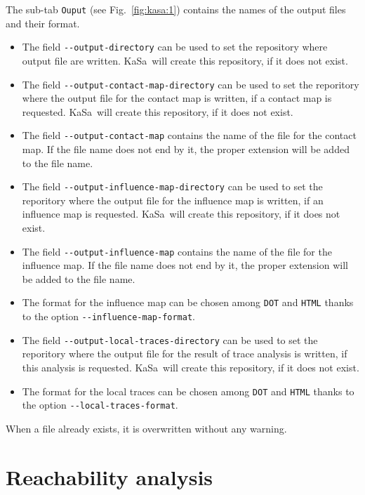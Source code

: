 \documentclass[11pt]{book}
\def\KaSa{\textsf{KaSa}}
\begin{document}
The sub-tab \texttt{Ouput} (see Fig.~\ref{fig:kasa:1}) contains the names of the output files and their format.

\begin{itemize}
\item The field \texttt{-{}-output-directory} can be used to set the repository where output file are written. \KaSa~will create this repository, if it does not exist.
\item The field \texttt{-{}-output-contact-map-directory} can be used to set the reporitory where the output file for the contact map is written, if a contact map is requested. \KaSa~will create this repository, if it does not exist.
\item The field \texttt{-{}-output-contact-map} contains the name of the file for the contact map. If the file name does not end by it, the proper extension will be added to the file name.
\item The field \texttt{-{}-output-influence-map-directory} can be used to set the reporitory where the output file for the influence map is written, if an influence map is requested. \KaSa~will create this repository, if it does not exist.
\item The field \texttt{-{}-output-influence-map} contains the name of the file for the influence map. If the file name does not end by it, the proper extension will be added to the file name.
\item The format for the influence map can be chosen among \texttt{DOT} and \texttt{HTML} thanks to the option \texttt{-{}-influence-map-format}.
\item The field \texttt{-{}-output-local-traces-directory} can be used to set the reporitory where the output file for the result of trace analysis is written, if this analysis is requested. \KaSa~will create this repository, if it does not exist.
\item The format for the local traces can be chosen among \texttt{DOT} and \texttt{HTML} thanks to the option \texttt{-{}-local-traces-format}.


\end{itemize}

When a file already exists, it is overwritten without any warning.

\section{Reachability analysis}
\end{document}
